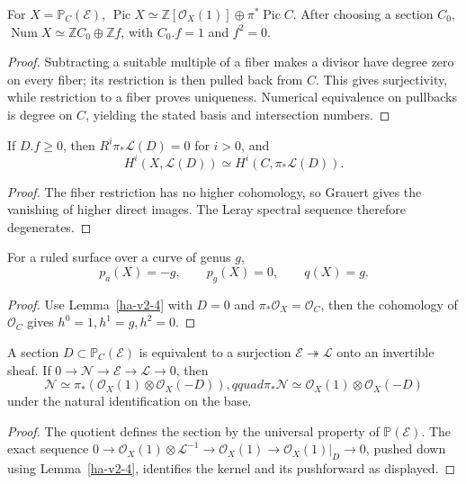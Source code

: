 \begin{proposition}
\label{ha-v2-3}
For \(X=\mathbb P_C(\mathcal E)\),
\(\operatorname{Pic}X\simeq\mathbb Z[\mathcal O_X(1)]\oplus\pi^*\operatorname{Pic}C\).
After choosing a section \(C_0\), \(\operatorname{Num}X\simeq\mathbb Z C_0\oplus\mathbb Z f\),
with \(C_0.f=1\) and \(f^2=0\).

\end{proposition}
\begin{proof}
Subtracting a suitable multiple of a fiber makes a divisor have degree zero
on every fiber; its restriction is then pulled back from \(C\).  This gives
surjectivity, while restriction to a fiber proves uniqueness.  Numerical
equivalence on pullbacks is degree on \(C\), yielding the stated basis and
intersection numbers.
\end{proof}

\begin{lemma}
\label{ha-v2-4}
If \(D.f\ge0\), then \(R^i\pi_*\mathcal L(D)=0\) for \(i>0\), and
\[
 H^i(X,\mathcal L(D))\simeq H^i(C,\pi_*\mathcal L(D)).
\]

\end{lemma}
\begin{proof}
The fiber restriction has no higher cohomology, so Grauert gives the vanishing
of higher direct images.  The Leray spectral sequence therefore degenerates.
\end{proof}

\begin{corollary}
\label{ha-v2-5}
For a ruled surface over a curve of genus \(g\),
\[
 p_a(X)=-g,\qquad p_g(X)=0,\qquad q(X)=g.
\]
\end{corollary}
\begin{proof}
Use Lemma~\ref{ha-v2-4} with \(D=0\) and \(\pi_*\mathcal O_X=\mathcal O_C\),
then the cohomology of \(\mathcal O_C\) gives \(h^0=1,h^1=g,h^2=0\).
\end{proof}

\begin{proposition}
\label{ha-v2-6}
A section \(D\subset\mathbb P_C(\mathcal E)\) is equivalent to a surjection
\(\mathcal E\twoheadrightarrow\mathcal L\) onto an invertible sheaf.  If
\(0\to\mathcal N\to\mathcal E\to\mathcal L\to0\), then
\[
 \mathcal N\simeq\pi_*(\mathcal O_X(1)\otimes\mathcal O_X(-D)),qquad
 \pi_*\mathcal N\simeq\mathcal O_X(1)\otimes\mathcal O_X(-D)
\]
under the natural identification on the base.
\end{proposition}
\begin{proof}
The quotient defines the section by the universal property of \(\mathbb P(\mathcal E)\).
The exact sequence
\(0\to\mathcal O_X(1)\otimes\mathcal L^{-1}\to\mathcal O_X(1)\to
\mathcal O_X(1)|_D\to0\), pushed down using Lemma~\ref{ha-v2-4}, identifies
the kernel and its pushforward as displayed.
\end{proof}

